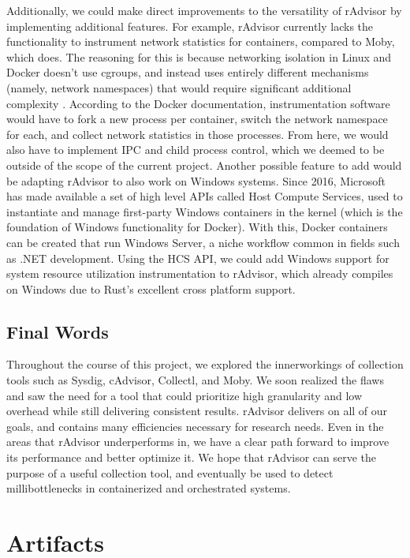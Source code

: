 \documentclass[a4paper,11pt]{article}
\begin{document}
Additionally, we could make direct improvements to the versatility of rAdvisor by implementing additional features.
For example, rAdvisor currently lacks the functionality to instrument network statistics for containers,
compared to Moby, which does.
The reasoning for this is because networking isolation in Linux and Docker doesn't use cgroups,
and instead uses entirely different mechanisms (namely, network namespaces)
that would require significant additional complexity \cite{DockerCgroups}.
According to the Docker documentation, instrumentation software would have to fork a new process per container,
switch the network namespace for each, and collect network statistics in those processes.
From here, we would also have to implement IPC and child process control,
which we deemed to be outside of the scope of the current project.
Another possible feature to add would be adapting rAdvisor to also work on Windows systems.
Since 2016, Microsoft has made available a set of high level APIs called Host Compute Services,
used to instantiate and manage first-party Windows containers in the kernel \cite{HCS}
(which is the foundation of Windows functionality for Docker).
With this, Docker containers can be created that run Windows Server,
a niche workflow common in fields such as .NET development.
Using the HCS API, we could add Windows support for system resource utilization instrumentation
to rAdvisor, which already compiles on Windows due to Rust's excellent cross platform support.

\subsection{Final Words}

Throughout the course of this project, we explored the innerworkings of collection tools
such as Sysdig, cAdvisor, Collectl, and Moby.
We soon realized the flaws and saw the need for a tool that could prioritize high granularity and low overhead
while still delivering consistent results.
rAdvisor delivers on all of our goals, and contains many efficiencies necessary for research needs.
Even in the areas that rAdvisor underperforms in,
we have a clear path forward to improve its performance and better optimize it.
We hope that rAdvisor can serve the purpose of a useful collection tool,
and eventually be used to detect millibottlenecks in containerized and orchestrated systems.

\pagebreak
\printbibliography

\pagebreak
\appendix
\section{Artifacts}
\label{app:artifacts}
\end{document}
